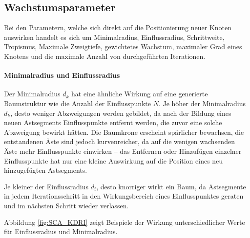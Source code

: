 \subsection{Wachstumsparameter}

Bei den Parametern, welche sich direkt auf die Positionierung neuer Knoten auswirken handelt es sich um Minimalradius, Einflussradius, Schrittweite, Tropismus, Maximale Zweigtiefe, gewichtetes Wachstum, maximaler Grad eines Knotens und die maximale Anzahl von durchgeführten Iterationen.

\paragraph{Minimalradius und Einflussradius}

Der Minimalradius $d_k$ hat eine ähnliche Wirkung auf eine generierte Baumstruktur wie die Anzahl der Einflusspunkte $N$. Je höher der Minimalradius $d_k$, desto weniger Abzweigungen werden gebildet, da nach der Bildung eines neuen Astsegments Einflusspunkte entfernt werden, die zuvor eine solche Abzweigung bewirkt hätten. Die Baumkrone erscheint spärlicher bewachsen, die entstandenen Äste sind jedoch kurvenreicher, da auf die wenigen wachsenden Äste mehr Einflusspunkte einwirken -- das Entfernen oder Hinzufügen einzelner Einflusspunkte hat nur eine kleine Auswirkung auf die Position eines neu hinzugefügten Astsegments. \cite[S.3]{SpaceColonizationAlgorithm:07}

Je kleiner der Einflussradius $d_i$, desto knorriger wirkt ein Baum, da Astsegmente in jedem Iterationsschritt in den Wirkungsbereich eines Einflusspunktes geraten und im nächsten Schritt wieder verlassen. \cite[S.4]{SpaceColonizationAlgorithm:07}

Abbildung \ref{fig:SCA_KDRI} zeigt Beispiele der Wirkung unterschiedlicher Werte für Einflussradius und Minimalradius.

